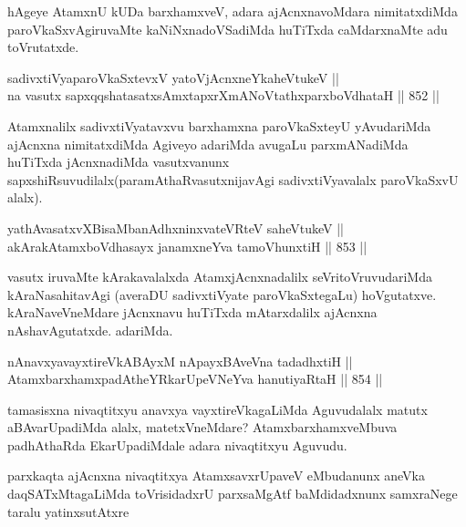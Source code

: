 \begin{artha}
hAgeye AtamxnU kUDa barxhamxveV, adara ajAcnxnavoMdara nimitatxdiMda paroVkaSxvAgiruvaMte kaNiNxnadoVSadiMda huTiTxda caMdarxnaMte adu toVrutatxde.
\end{artha}

\begin{shl}
sadivxtiVyaparoVkaSxtevxV yatoV\s jAcnxneYkaheVtukeV || \\
na vasutx sapxqqshatasatxsAmxtapxrXmANoVtathxparxboVdhataH \hfill || 852 ||  
\end{shl}

\begin{artha}
Atamxnalilx sadivxtiVyatavxvu barxhamxna paroVkaSxteyU yAvudariMda ajAcnxna nimitatxdiMda Agiveyo adariMda avugaLu parxmANadiMda huTiTxda jAcnxnadiMda vasutxvanunx sapxshiRsuvudilalx(paramAthaRvasutxnijavAgi sadivxtiVyavalalx paroVkaSxvU alalx).
\end{artha}

\begin{shl}
yathAvasatxvXBisaMbanAdhxninxvateVRteV saheVtukeV || \\
akArakAtamxboVdhasayx janamxneYva tamoVhunxtiH \hfill || 853 ||  
\end{shl}

\begin{artha}
vasutx iruvaMte kArakavalalxda AtamxjAcnxnadalilx seVritoVruvudariMda kAraNasahitavAgi (averaDU sadivxtiVyate paroVkaSxtegaLu) hoVgutatxve. kAraNaveVneMdare jAcnxnavu huTiTxda mAtarxdalilx ajAcnxna nAshavAgutatxde. adariMda.
\end{artha}


\begin{shl}
nAnavxyavayxtireVkABAyxM nApayxBAveVna tadadhxtiH || \\
AtamxbarxhamxpadAtheYRkarUpeVNeYva hanutiyaRtaH \hfill || 854 ||  
\end{shl}

\begin{artha}
tamasisxna nivaqtitxyu anavxya vayxtireVkagaLiMda Aguvudalalx matutx aBAvarUpadiMda alalx, matetxVneMdare? AtamxbarxhamxveMbuva padhAthaRda EkarUpadiMdale adara nivaqtitxyu Aguvudu.
\end{artha}

\begin{artha}
parxkaqta ajAcnxna nivaqtitxya AtamxsavxrUpaveV eMbudanunx aneVka daqSATxMtagaLiMda toVrisidadxrU parxsaMgAtf baMdidadxnunx samxraNege taralu yatinxsutAtxre\ndash 
\end{artha}


